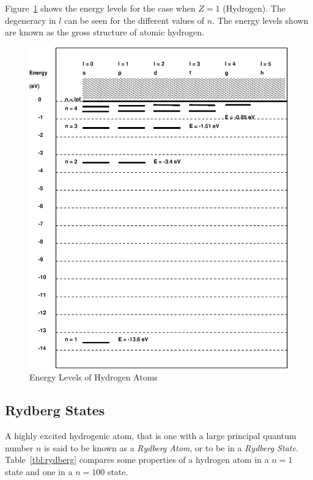 \documentclass[a4paper]{IEEEtran}
\begin{document}
    Figure~\ref{fig:hydrogen-energy} shows the energy levels for the case when $Z = 1$ (Hydrogen).
    The degeneracy in $l$ can be seen for the different values of $n$.
    The energy levels shown are known as the gross structure of atomic hydrogen.

    \begin{figure}[!t] 
        \centering
        \includegraphics[width=\columnwidth]{levels.eps}
        \caption{Energy Levels of Hydrogen Atoms} 
        \label{fig:hydrogen-energy} 
    \end{figure} 

    \subsection{Rydberg States}
    A highly excited hydrogenic atom, that is one with a large principal quantum 
    number $n$ is said to be known as a \emph{Rydberg Atom}, or to be in a
    \emph{Rydberg State}.
    Table~\ref{tbl:rydberg} compares some properties of a hydrogen atom in a $n=1$ state
    and one in a $n=100$ state.
\end{document}
